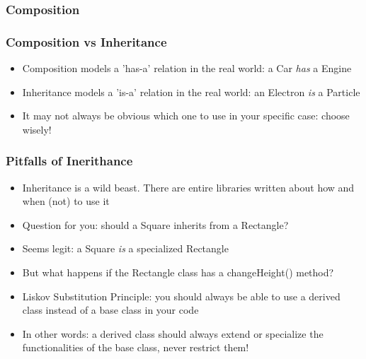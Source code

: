 \documentclass[9pt]{beamer}
\begin{document}
\begin{frame}
  \frametitle{Composition}
  
\end{frame}


\begin{frame}
  \frametitle{Composition vs Inheritance}
    
  \begin{itemize}
    \item Composition models a \alert{'has-a'} relation in the real world: a 
          Car \emph{has} a Engine
    \medskip
    \item Inheritance models a \alert{'is-a'} relation in the real world: an
          Electron \emph{is} a Particle
    \medskip
    \item It may not always be obvious which one to use in your specific case:
          choose wisely!
  \end{itemize}
  
\end{frame}



\begin{frame}
  \frametitle{Pitfalls of Inerithance}
    
  \begin{itemize}
    \item Inheritance is a wild beast. There are entire libraries written about how and when (not) to use it
    
    \bigskip
    
    \item Question for you: should a Square inherits from a Rectangle?
    \item Seems legit: a Square \emph{is} a specialized Rectangle
    \item But what happens if the Rectangle class has a changeHeight() method?
    \bigskip
    
    \bigskip
    
    \item \alert{Liskov Substitution Principle}: you should always be able to use
          a derived class instead of a base class in your code
    \item In other words: a derived class should always extend or specialize
          the functionalities of the base class, never restrict them!
   \end{itemize}
  
\end{frame}
\end{document}
